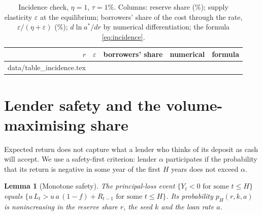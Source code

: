 \documentclass[preprint,11pt,authoryear]{elsarticle}
\makeatletter
\newtheorem{lemma}{Lemma}
\theoremstyle{definition}
\newcommand{\inputrows}[1]{\@@input #1 }
\makeatother
\begin{document}
\begin{table}[ht]
  \centering\small
  \caption{Incidence check, $\eta=1$, $\tau=1\%$. Columns: reserve share (\%); supply elasticity $\varepsilon$ at
  the equilibrium; borrowers' share of the cost through the rate, $\varepsilon/(\eta+\varepsilon)$ (\%);
  $d\ln a^*/dr$ by numerical differentiation; the formula \eqref{eq:incidence}.}
  \label{tab:incidence}
  \begin{tabular}{rrrrr}
    \toprule
    $r$ & $\varepsilon$ & borrowers' share & numerical & formula \\
    \midrule
    \inputrows{data/table_incidence.tex}
    \bottomrule
  \end{tabular}
\end{table}

\section{Lender safety and the volume-maximising share}\label{sec:safety}

Expected return does not capture what a lender who thinks of its deposit as cash will accept. We use a
safety-first criterion: lender $\alpha$ participates if the probability that its return is negative in some
year of the first $H$ years does not exceed $\alpha$.

\begin{lemma}[Monotone safety]\label{lem:mono}
The principal-loss event $\{Y_t<0\text{ for some }t\le H\}$ equals $\{u\,L_t>u\,a\,(1-f)+R_{t-1}\text{ for some }t\le H\}$.
Its probability $p_H(r,k,a)$ is nonincreasing in the reserve share $r$, the seed $k$ and the loan rate $a$.
\end{lemma}
\end{document}
